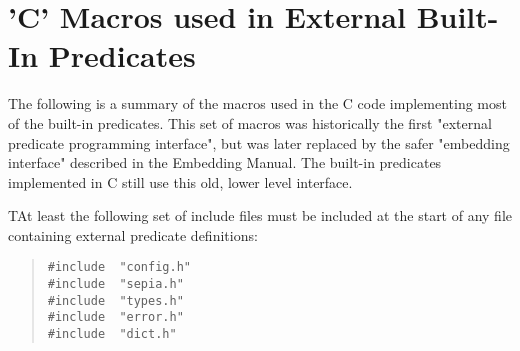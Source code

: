 %
% 
% 
% 
% 

%

%
%
%

\chapter{'C' Macros used in External Built-In Predicates}
\label{chapcmacros}

The following is a summary of the macros used in the C code implementing
most of the {\eclipse} built-in predicates.
This set of macros was historically the first "external predicate
programming interface", but was later replaced by the safer "embedding
interface" described in the Embedding Manual.
The built-in predicates implemented in C still use this old, lower
level interface.

TAt least the following set of include files
must be included at the start of any file containing external predicate
definitions:
\begin{quote}
\begin{verbatim}
#include  "config.h"
#include  "sepia.h"
#include  "types.h"
#include  "error.h"
#include  "dict.h"
\end{verbatim}
\end{quote}

